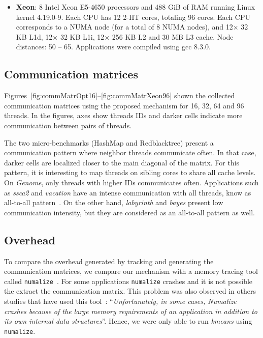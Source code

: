 \begin{itemize}
	\item \textbf{Xeon}: 8 Intel Xeon E5-4650 processors and 488 GiB of RAM running Linux kernel 4.19.0-9. Each CPU has 12 2-HT cores, totaling 96 cores. Each CPU corresponds to a NUMA node (for a total of 8 NUMA nodes), and 12$\times$ 32 KB L1d, 12$\times$ 32 KB L1i, 12$\times$ 256 KB L2 and 30 MB L3 cache. Node distances: 50 -- 65. Applications were compiled using gcc 8.3.0.
\end{itemize}

\subsection{Communication matrices}\label{sect:StampMatrices}
Figures~\ref{fig:commMatrOpt16}--\ref{fig:commMatrXeon96} shown the collected communication matrices using the proposed mechanism for 16, 32, 64 and 96 threads. In the figures, axes show threads IDs and darker cells indicate more communication between pairs of threads.


The two micro-benchmarks (HashMap and Redblacktree) present a communication pattern where neighbor threads communicate often. In that case, darker cells are localized closer to the main diagonal of the matrix. For this pattern, it is interesting to map threads on sibling cores to share all cache levels. On \emph{Genome}, only threads with higher IDs communicates often. Applications such as \emph{ssca2} and \emph{vacation} have an intense communication with all threads, know as all-to-all pattern~\cite{Williams:2009}. On the other hand, \emph{labyrinth} and \emph{bayes} present low communication intensity, but they are considered as an all-to-all pattern as well.


\subsection{Overhead}
To compare the overhead generated by tracking and generating the communication matrices, we compare our mechanism with a memory tracing tool called \texttt{numalize}~\cite{Diener2015}. For some applications \texttt{numalize} crashes and it is not possible the extract the communication matrix. This problem was also observed in others studies that have used this tool~\cite{Soomro:2018}: ``\textit{Unfortunately, in some cases, Numalize crashes because of the large memory requirements of an application in addition to its own internal data structures}''.
Hence, we were only able to run \emph{kmeans} using \texttt{numalize}.

